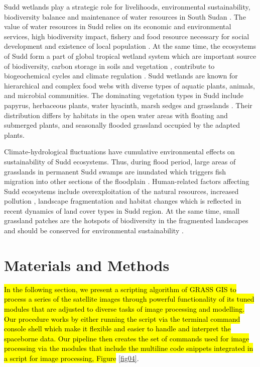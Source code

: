 \documentclass[analytics,article,submit,pdftex,moreauthors]{Definitions/mdpi}
\begin{document}
Sudd wetlands play a strategic role for livelihoods, environmental sustainability, biodiversity balance and maintenance of water resources in South Sudan \cite{Benansio}. The value of water resources in Sudd relies on its economic and environmental services, high biodiversity impact, fishery and food resource \cite{Bailey} necessary for social development and existence of local population \cite{assessment2005ecosystems}. At the same time, the ecosystems of Sudd form a part of global tropical wetland system which are important source of biodiversity, carbon storage in soils and vegetation \cite{Thompson}, contribute to biogeochemical cycles and climate regulation \cite{Fynn}. Sudd wetlands are known for hierarchical and complex food webs with diverse types of aquatic plants, animals, and microbial communities. The dominating vegetation types in Sudd include papyrus, herbaceous plants, water hyacinth, marsh sedges and grasslands \cite{PACINI2018142}. Their distribution differs by habitats in the open water areas with floating and submerged plants, and seasonally flooded grassland occupied by the adapted plants. 

Climate-hydrological fluctuations have cumulative environmental effects on sustainability of Sudd ecosystems. Thus, during flood period, large areas of grasslands in permanent Sudd swamps are inundated which triggers fish migration into other sections of the floodplain \cite{Hickley}. Human-related factors affecting Sudd ecosystems include overexploitation of the natural resources, increased pollution \cite{LOW2021113424}, landscape fragmentation \cite{Collins} and habitat changes \cite{NAGENDRA201345} which is reflected in recent dynamics of land cover types in Sudd region. At the same time, small grassland patches are the hotspots of biodiversity in the fragmented landscapes and should be conserved for environmental sustainability \cite{YAN2021108086}. 

\section{Materials and Methods}

\hl{In the following section, we present a scripting algorithm of GRASS GIS to process a series of the satellite images through powerful functionality of its tuned modules that are adjusted to diverse tasks of image processing and modelling. Our procedure works by either running the script via the terminal command console shell which make it flexible and easier to handle and interpret the spaceborne data. Our pipeline then creates the set of commands used for image processing via the modules that include the multiline code snippets integrated in a script for image processing, Figure }\ref{fig04}.
\end{document}

